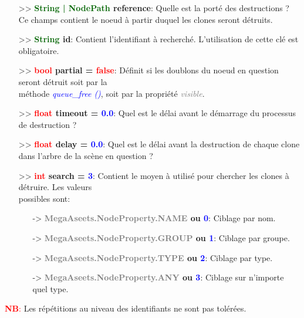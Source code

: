 \documentclass[a4paper, 11pt]{article}
\begin{document}
	\begin{itemize}
		\item[>> \textbf{\textcolor{darkgreen}{String | NodePath} reference}:] Quelle est la porté des 
		destructions ? Ce champs contient le noeud à partir duquel les clones seront détruits.\\
		\item[>> \textbf{\textcolor{darkgreen}{String} id}:] Contient l'identifiant à recherché. 
		L'utilisation de cette clé est obligatoire.\\
		\item[>> \textbf{\textcolor{red}{bool} partial = \textcolor{red}{false}}:] Définit si les doublons 
		du noeud en question seront détruit soit par la \\méthode \textcolor{blue}{\textit{queue\_free ()}}, 
		soit par la propriété \textcolor{gray}{\textit{visible}}.\\
		\item[>> \textbf{\textcolor{red}{float} timeout = \textcolor{blue}{0.0}}:] Quel est le délai avant 
		le démarrage du processus de destruction ?\\
		\item[>> \textbf{\textcolor{red}{float} delay = \textcolor{blue}{0.0}}:] Quel est le délai avant la 
		destruction de chaque clone dans l'arbre de la scène en question ?\\
		\item[>> \textbf{\textcolor{red}{int} search = \textcolor{blue}{3}}:] Contient le moyen à utilisé 
		pour chercher les clones à détruire. Les valeurs \\possibles sont:
		\begin{itemize}
			\item[-> \textbf{\textcolor{gray}{MegaAseets.NodeProperty.NAME} ou \textcolor{blue}{0}}:] 
			Ciblage par nom.
			\item[-> \textbf{\textcolor{gray}{MegaAseets.NodeProperty.GROUP} ou \textcolor{blue}{1}}:] 
			Ciblage par groupe.
			\item[-> \textbf{\textcolor{gray}{MegaAseets.NodeProperty.TYPE} ou \textcolor{blue}{2}}:] 
			Ciblage par type.
			\item[-> \textbf{\textcolor{gray}{MegaAseets.NodeProperty.ANY} ou \textcolor{blue}{3}}:] Ciblage 
			sur n'importe quel type.\\
		\end{itemize}
	\end{itemize}
	\textcolor{red}{\textbf{NB}:} Les répétitions au niveau des identifiants ne sont pas tolérées.
\end{document}

